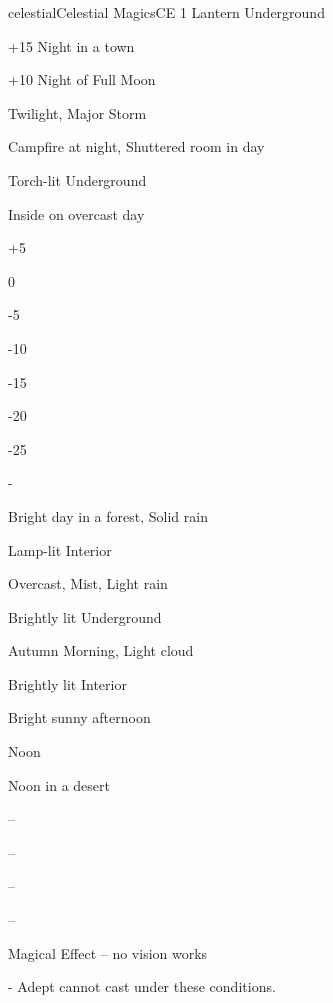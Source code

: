\begin{College}[1.3]{celestial}{Celestial Magics}{CE}
1 Lantern Underground 

+15  Night in a town 

+10  Night of Full Moon 

Twilight, Major Storm 

Campfire at night, Shuttered room in day 

Torch-lit Underground 

Inside on overcast day 

+5 

0 

-5 

-10 

-15 

-20 

-25 

- 

Bright day in a forest, Solid rain 

Lamp-lit Interior 

Overcast, Mist, Light rain 

Brightly lit Underground 

Autumn Morning, Light cloud 

Brightly lit Interior 

Bright sunny afternoon 

Noon 

Noon in a desert 

– 

– 

– 

– 

Magical Effect – no vision works 

- Adept cannot cast under these conditions. 

\end{College}
